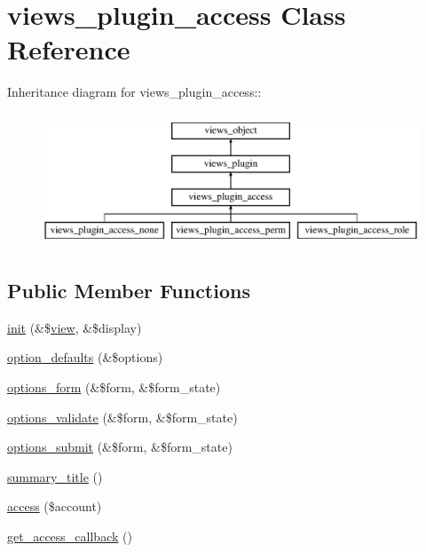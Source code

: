 \hypertarget{classviews__plugin__access}{
\section{views\_\-plugin\_\-access Class Reference}
\label{classviews__plugin__access}
}
Inheritance diagram for views\_\-plugin\_\-access::\begin{figure}[H]
\begin{center}
\leavevmode
\includegraphics[height=4cm]{classviews__plugin__access}
\end{center}
\end{figure}
\subsection*{Public Member Functions}
\begin{CompactItemize}
\item 
\hyperlink{classviews__plugin__access_1b295cea820f403d1e361e7de4e3800e}{init} (\&\$\hyperlink{classview}{view}, \&\$display)
\item 
\hyperlink{classviews__plugin__access_6e5248925c3c3a8059e0a7121bc6777b}{option\_\-defaults} (\&\$options)
\item 
\hyperlink{classviews__plugin__access_530865442ea42db5e720e6c49f3d16f2}{options\_\-form} (\&\$form, \&\$form\_\-state)
\item 
\hyperlink{classviews__plugin__access_1ac0bea409be6ef8d7eb4bfafcf760c6}{options\_\-validate} (\&\$form, \&\$form\_\-state)
\item 
\hyperlink{classviews__plugin__access_d0610dfaa0e225c5d2cd85c7a13287fd}{options\_\-submit} (\&\$form, \&\$form\_\-state)
\item 
\hyperlink{classviews__plugin__access_de500a95e599deffa417f8cbdd67bbf4}{summary\_\-title} ()
\item 
\hyperlink{classviews__plugin__access_d24d38c1b1a1bd7527b2b96a2103cede}{access} (\$account)
\item 
\hyperlink{classviews__plugin__access_d4038a32fccc6a662a74f437d0bf6a23}{get\_\-access\_\-callback} ()
\end{CompactItemize}


